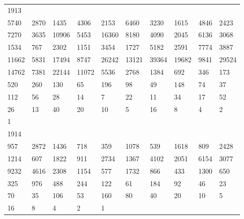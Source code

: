 \begin{longtable}{*{10}{l}}
1913&&&&&&&&&\\
5740& 2870& 1435& 4306& 2153& 6460& 3230& 1615& 4846& 2423\\
7270& 3635& 10906& 5453& 16360& 8180& 4090& 2045& 6136& 3068\\
1534& 767& 2302& 1151& 3454& 1727& 5182& 2591& 7774& 3887\\
11662& 5831& 17494& 8747& 26242& 13121& 39364& 19682& 9841& 29524\\
14762& 7381& 22144& 11072& 5536& 2768& 1384& 692& 346& 173\\
520& 260& 130& 65& 196& 98& 49& 148& 74& 37\\
112& 56& 28& 14& 7& 22& 11& 34& 17& 52\\
26& 13& 40& 20& 10& 5& 16& 8& 4& 2\\
1& \\

1914&&&&&&&&&\\
957& 2872& 1436& 718& 359& 1078& 539& 1618& 809& 2428\\
1214& 607& 1822& 911& 2734& 1367& 4102& 2051& 6154& 3077\\
9232& 4616& 2308& 1154& 577& 1732& 866& 433& 1300& 650\\
325& 976& 488& 244& 122& 61& 184& 92& 46& 23\\
70& 35& 106& 53& 160& 80& 40& 20& 10& 5\\
16& 8& 4& 2& 1& \\


\end{longtable}
